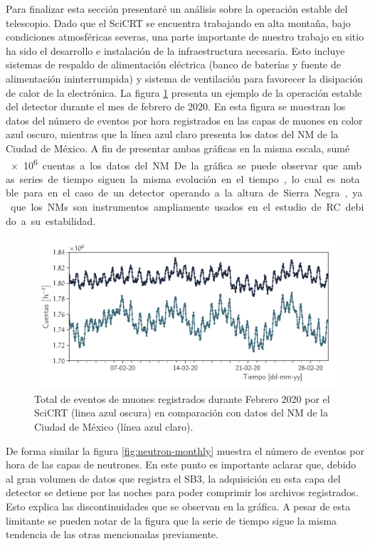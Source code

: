 Para finalizar esta sección presentaré un análisis sobre la operación estable del telescopio. Dado que el SciCRT se encuentra trabajando en alta montaña, bajo condiciones atmosféricas severas, una parte importante de nuestro trabajo en sitio ha sido el desarrollo e instalación de la infraestructura necesaria. Esto incluye sistemas de respaldo de alimentación eléctrica (banco de baterías y fuente de alimentación ininterrumpida) y sistema de ventilación para favorecer la disipación de calor de la electrónica. La figura \ref{fig:muon-monthly} presenta un ejemplo de la operación estable del detector durante el mes de febrero de \num{2020}. En esta figura se muestran los datos del número de eventos por hora registrados en las capas de muones en color azul oscuro, mientras que la línea azul claro presenta los datos del NM de la Ciudad de México. A fin de presentar ambas gráficas en la misma escala, sumé \SI{e6} cuentas a los datos del NM. De la gráfica se puede observar que ambas series de tiempo siguen la misma evolución en el tiempo, lo cual es notable para en el caso de un detector operando a la altura de Sierra Negra, ya que los NMs son instrumentos ampliamente usados en el estudio de RC debido a su estabilidad.

\begin{figure}
        \centering
        \includegraphics[width=\textwidth]{muon-monthly.pdf}
        \caption{Total de eventos de muones registrados durante Febrero \num{2020} por el SciCRT (linea azul oscura) en comparación con datos del NM de la Ciudad de México (línea azul claro).}
        \label{fig:muon-monthly}
\end{figure}

De forma similar la figura \ref{fig:neutron-monthly} muestra el número de eventos por hora de las capas de neutrones. En este punto es importante aclarar que, debido al gran volumen de datos que registra el SB3, la adquisición en esta capa del detector se detiene por las noches para poder comprimir los archivos registrados. Esto explica las discontinuidades que se observan en la gráfica. A pesar de esta limitante se pueden notar de la figura que la serie de tiempo sigue la misma tendencia de las otras mencionadas previamente.

